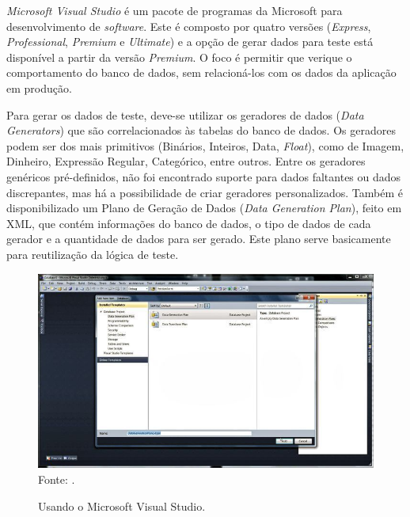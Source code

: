 \documentclass[
	12pt,				%
	openright,			%
	oneside,			%
	a4paper,			%
	english,			%
	brazil				%
	]{abntex2}
\begin{document}
		\emph{Microsoft Visual Studio} \cite{VSDataGenerator} é um pacote de programas da Microsoft para desenvolvimento de \emph{software}. 
		Este é composto por quatro versões (\emph{Express}, \emph{Professional}, \emph{Premium} e \emph{Ultimate}) e a opção de gerar dados para teste está disponível a partir da versão \emph{Premium}.
		O foco é permitir que verique o comportamento do banco de dados, sem relacioná-los com os dados da aplicação em produção.
		\par
		Para gerar os dados de teste, deve-se utilizar os geradores de dados (\emph{Data Generators}) que são correlacionados às tabelas do banco de dados.
			Os geradores podem ser dos mais primitivos (Binários, Inteiros, Data, \emph{Float}), como de Imagem, Dinheiro, Expressão Regular, Categórico, entre outros.
		Entre os geradores genéricos pré-definidos, não foi encontrado suporte para dados faltantes ou dados discrepantes, mas há a possibilidade de criar geradores personalizados.
		Também é disponibilizado um Plano de Geração de Dados (\emph{Data Generation Plan}), feito em XML, que contém informações do banco de dados, o tipo de dados de cada gerador e a quantidade de dados para ser gerado. 
		Este plano serve basicamente para reutilização da lógica de teste.
		\begin{figure}[h]
			\centering
			\caption{Usando o Microsoft Visual Studio.}
			\includegraphics[width=\linewidth]{./figures/TrabalhosRelacionados/Visual-Studio.jpg}
			\label{fig:VSDG}
			\footnotesize Fonte: \cite{VSDataGenerator}.
		\end{figure}
\end{document}
